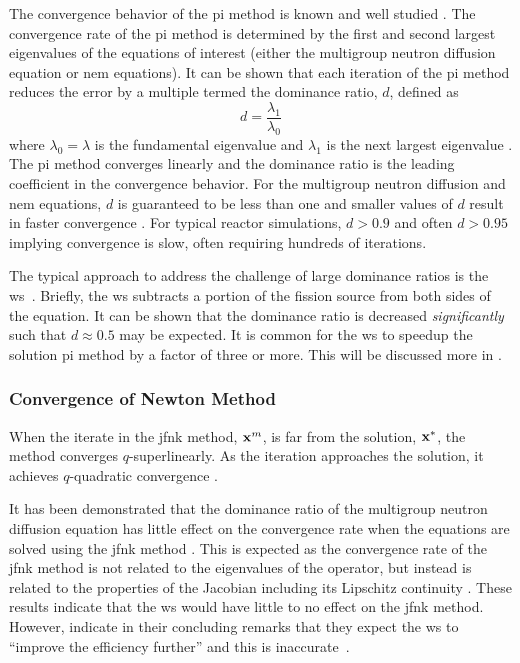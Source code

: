       The convergence behavior of the \gls{pi} method is known and well studied 
      \cite{nakamura,gehinThesis,my_ms_thesis}. The convergence rate of the
      \gls{pi} method is determined by the first and second largest eigenvalues
      of the equations of interest (either the multigroup neutron diffusion
      equation or \gls{nem} equations). It can be shown that each iteration of
      the \gls{pi} method reduces the error by a multiple termed the dominance
      ratio, $d$, defined as
      \begin{equation}
        \label{eq:dominance_ratio}
        d = \frac{\lambda_1}{\lambda_0}
      \end{equation}
      where $\lambda_0 = \lambda$ is the fundamental eigenvalue and $\lambda_1$
      is the next largest eigenvalue \cite{my_ms_thesis}. The \gls{pi} method
      converges linearly and the dominance ratio is the leading coefficient in 
      the convergence behavior. For the multigroup neutron diffusion and
      \gls{nem} equations, $d$ is guaranteed to be less than one and smaller
      values of $d$ result in faster convergence \cite{nakamura}. For typical
      reactor simulations, $d > 0.9$ and often $d > 0.95$ implying convergence
      is slow, often requiring hundreds of iterations.

      The typical approach to address the challenge of large dominance ratios is
      the \gls{ws}~\cite{gehinThesis}. Briefly, the \gls{ws} subtracts a portion
      of the fission source from both sides of the equation. It can be shown
      that the dominance ratio is decreased \textit{significantly} such that $d
      \approx 0.5$ may be expected. It is common for the \gls{ws} to speedup 
      the solution \gls{pi} method by a factor of three or more. This will be
      discussed more in .

    \subsubsection{Convergence of Newton Method}

      When the iterate in the \gls{jfnk} method, $\mathbf{x}^m$, is far from the
      solution, $\mathbf{x}^*$, the method converges $q$-superlinearly. As the
      iteration approaches the solution, it achieves $q$-quadratic convergence
      \cite{textbookkelley}.

      It has been demonstrated that the dominance ratio of the multigroup
      neutron diffusion equation has little effect on the convergence rate when
      the equations are solved using the \gls{jfnk} method \cite{gill_azmy}.
      This is expected as the convergence rate of the \gls{jfnk} method is not
      related to the eigenvalues of the operator, but instead is related to the
      properties of the Jacobian including its Lipschitz continuity
      \cite{textbookkelley}. These results indicate that the \gls{ws} would have
      little to no effect on the \gls{jfnk} method. However,
      \citeauthor{qe2paper} indicate in their concluding remarks that they
      expect the \gls{ws} to ``improve the efficiency further'' and this is
      inaccurate~\cite{qe2paper}.
      

